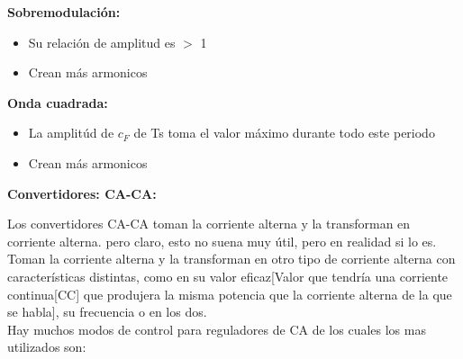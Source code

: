 \documentclass[a3paper,12pt]{article}
\begin{document}
{\begin{flushleft}
\begin{LARGE}
\begin{itemize}
 \end{itemize}
 
\begin{huge}
\hspace{3cm}\textbf{Sobremodulación:}
\end{huge}
\begin{itemize}
	\item Su relación de amplitud es $>$ 1
	\item Crean más armonicos 
\end{itemize}

\end{LARGE}

	
\begin{huge}
\hspace{3cm}\textbf{Onda cuadrada:}
\end{huge}
\begin{LARGE}
\begin{itemize}
	\item La amplitúd de $c_F$ de Ts toma el valor máximo durante todo este periodo
	\item Crean más armonicos 
\end{itemize}
\end{LARGE}

\vspace{1cm}

\begin{flushleft}

















{\color{cyan}\huge{\textbf{Convertidores: CA-CA:}}}\\
	\vspace{.3cm}
\end{flushleft}
\begin{LARGE}
	Los convertidores CA-CA toman la corriente alterna y la transforman en corriente alterna. pero claro, esto no suena muy útil, pero en realidad si lo es. Toman la corriente alterna y la transforman en otro tipo de corriente alterna con características distintas, como en su valor eficaz[Valor que tendría una corriente continua[CC] que produjera la misma potencia que la corriente alterna de la que se habla], su frecuencia o en los dos.\\
	\vspace{3cm}
	Hay muchos modos de control para reguladores de CA de los cuales los mas utilizados son: 


\end{LARGE}
\end{flushleft}}
\end{document}
